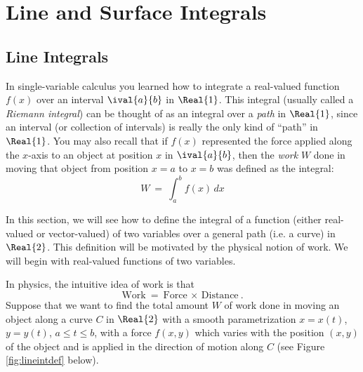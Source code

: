 \chapter{Line and Surface Integrals}
\markboth{}{} 
\section{Line Integrals}
In single-variable calculus you learned how to integrate a real-valued function $f(x)$ over an interval $\ival{a}{b}$
in $\Real{1}$. This integral (usually called a \emph{Riemann integral})
can be thought of as an integral over a \emph{path} in $\Real{1}$, since an interval
(or collection of intervals) is really the only kind of ``path'' in $\Real{1}$. You may also recall that if $f(x)$
represented the force applied along the $x$-axis to an object at position $x$ in $\ival{a}{b}$, then the \emph{work}
$W$ done in moving that object from position $x=a$ to $x=b$ was defined as the integral:
\begin{displaymath}
W ~=~ \int_a^b f(x)\,dx
\end{displaymath}

In this section, we will see how to define the integral of a function (either real-valued or vector-valued) of
two variables over a general path (i.e. a curve) in $\Real{2}$. This
definition will be motivated by the physical notion of work. We will begin with real-valued functions of
two variables.

In physics, the intuitive idea of work is that
\begin{displaymath}
 \text{Work} ~=~ \text{Force}\,\times\,\text{Distance} ~.
\end{displaymath}
Suppose that we want to find the total amount $W$ of work done in moving an object along a curve $C$ in
$\Real{2}$ with
a smooth parametrization $x=x(t)$, $y=y(t)$, $a \le t \le b$, with a force $f(x,y)$ which varies with the position
$(x,y)$ of the object and is applied in the direction of motion along $C$
(see Figure \ref{fig:lineintdef} below).\vspace{-2mm}

